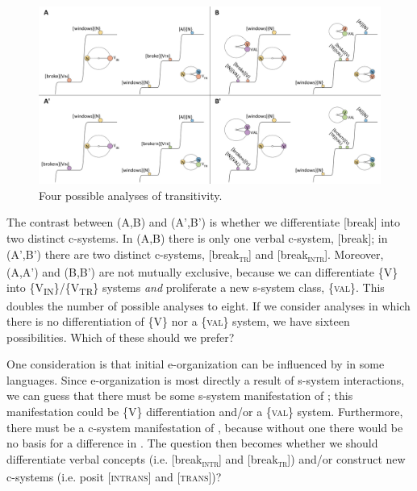   
\begin{figure}
\includegraphics[width=\textwidth]{figures/Tilsen-img72.png}
\caption{Four possible analyses of transitivity.}
\label{fig:4:22}
\end{figure}
 

  The contrast between (A,B) and (A',B') is whether we differentiate [break] into two distinct c-systems. In (A,B) there is only one verbal c-system, [break]; in (A',B') there are two distinct c-systems, [break\textsc{\textsubscript{tr}}] and [break\textsc{\textsubscript{intr}}]. Moreover, (A,A') and (B,B') are not mutually exclusive, because we can differentiate \{V\} into \{V\textsubscript{IN}\}/\{V\textsubscript{TR}\} systems \textit{and} proliferate a new s-system class, \{\textsc{val}\}. This doubles the number of possible analyses to eight. If we consider analyses in which there is no differentiation of \{V\} nor a \{\textsc{val}\} system, we have sixteen possibilities. Which of these should we prefer? 

  One consideration is that initial e-organization can be influenced by  in some languages. Since e-organization is most directly a result of s-system interactions, we can guess that there must be some s-system manifestation of ; this manifestation could be \{V\} differentiation and/or a \{\textsc{val}\} system. Furthermore, there must be a c-system manifestation of , because without one there would be no basis for a difference in . The question then becomes whether we should differentiate verbal concepts (i.e. [break\textsc{\textsubscript{intr}}] and [break\textsc{\textsubscript{tr}}]) and/or construct new c-systems (i.e. posit [\textsc{intrans}] and [\textsc{trans}])?

